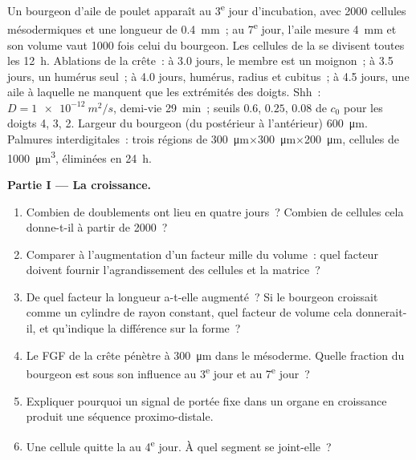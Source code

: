 \begin{problem}
\label{pb:b2:limb-organogenesis:1}
Un bourgeon d'aile de poulet apparaît au 3\textsuperscript{e} jour
d'incubation, avec \num{2000} cellules mésodermiques et une longueur de
\qty{0.4}{mm}~; au 7\textsuperscript{e} jour, l'aile mesure
\qty{4}{mm} et son volume vaut \num{1000} fois celui du bourgeon. Les
cellules de la  se divisent toutes les \qty{12}{h}.
Ablations de la crête~: à 3.0 jours, le membre est un moignon~; à
3.5 jours, un humérus seul~; à 4.0 jours, humérus, radius et cubitus~;
à 4.5 jours, une aile à laquelle ne manquent que les extrémités des
doigts. Shh~: $D = \qty{1e-12}{m^2/s}$, demi-vie \qty{29}{min}~; seuils
$0.6$, $0.25$, $0.08$ de $c_0$ pour les doigts 4, 3, 2. Largeur du
bourgeon (du postérieur à l'antérieur) \qty{600}{\micro m}. Palmures
interdigitales~: trois régions de
\qty{300}{\micro m}$\times$\qty{300}{\micro m}$\times$\qty{200}{\micro m},
cellules de \qty{1000}{\micro m^3}, éliminées en \qty{24}{h}.

\medskip
\noindent\textbf{Partie I --- La croissance.}
\begin{enumerate}
  \item Combien de doublements ont lieu en quatre jours~? Combien de
        cellules cela donne-t-il à partir de \num{2000}~?
  \item Comparer à l'augmentation d'un facteur mille du volume~: quel
        facteur doivent fournir l'agrandissement des cellules et la
        matrice~?
  \item De quel facteur la longueur a-t-elle augmenté~? Si le bourgeon
        croissait comme un cylindre de rayon constant, quel facteur de
        volume cela donnerait-il, et qu'indique la différence sur la
        forme~?
  \item Le FGF de la crête pénètre à \qty{300}{\micro m} dans le
        mésoderme. Quelle fraction du bourgeon est sous son influence au
        3\textsuperscript{e} jour et au 7\textsuperscript{e} jour~?
  \item Expliquer pourquoi un signal de portée fixe dans un organe en
        croissance produit une séquence proximo-distale.
  \item Une cellule quitte la  au
        4\textsuperscript{e} jour. À quel segment se joint-elle~?
\end{enumerate}


\end{problem}
